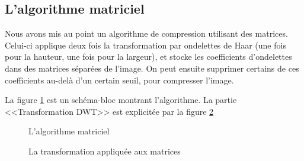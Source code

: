 
\subsection{L'algorithme matriciel}

Nous avons mis au point un algorithme de compression utilisant des matrices. Celui-ci applique deux fois la transformation par ondelettes de Haar (une fois pour la hauteur, une fois pour la largeur), et stocke les coefficients d'ondelettes dans des matrices séparées de l'image. On peut ensuite supprimer certains de ces coefficients au-delà d'un certain seuil, pour compresser l'image.

La figure \ref{mat1} est un schéma-bloc montrant l'algorithme. La partie <<Transformation DWT>> est explicitée par la figure \ref{mat2}
\begin{figure}[!h]
\centering
\scalebox{0.8}{
}
\caption{L'algorithme matriciel}
\label{mat1}
\end{figure}


\begin{figure}[!h]
\centering
\scalebox{0.8}{
}
\caption{La transformation appliquée aux matrices}
\label{mat2}
\end{figure}


\clearpage
